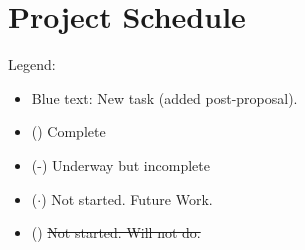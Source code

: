 
\pagebreak
\section*{Project Schedule}

Legend:
\begin{itemize}
    \item {\color{blue} Blue text: New task (added post-proposal).}
    \item (\checkmark)  Complete
    \item (\checkmark-)  Underway but incomplete
    \item ($\cdot$)  Not started. Future Work.
    \item (\xmark)  \sout{Not started.  Will not do.}
\end{itemize}
\bigskip

